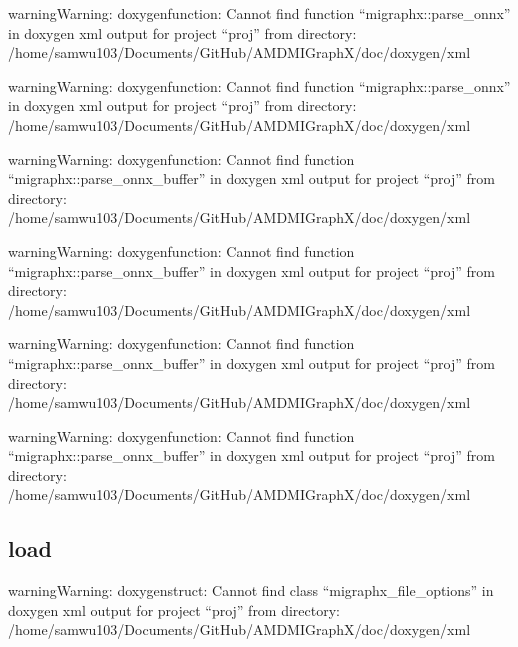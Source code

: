 \documentclass[letterpaper,10pt,english]{sphinxmanual}
\begin{document}
\begin{sphinxadmonition}{warning}{Warning:}
\sphinxAtStartPar
doxygenfunction: Cannot find function “migraphx::parse\_onnx” in doxygen xml output for project “proj” from directory: /home/samwu103/Documents/GitHub/AMDMIGraphX/doc/doxygen/xml
\end{sphinxadmonition}

\begin{sphinxadmonition}{warning}{Warning:}
\sphinxAtStartPar
doxygenfunction: Cannot find function “migraphx::parse\_onnx” in doxygen xml output for project “proj” from directory: /home/samwu103/Documents/GitHub/AMDMIGraphX/doc/doxygen/xml
\end{sphinxadmonition}

\begin{sphinxadmonition}{warning}{Warning:}
\sphinxAtStartPar
doxygenfunction: Cannot find function “migraphx::parse\_onnx\_buffer” in doxygen xml output for project “proj” from directory: /home/samwu103/Documents/GitHub/AMDMIGraphX/doc/doxygen/xml
\end{sphinxadmonition}

\begin{sphinxadmonition}{warning}{Warning:}
\sphinxAtStartPar
doxygenfunction: Cannot find function “migraphx::parse\_onnx\_buffer” in doxygen xml output for project “proj” from directory: /home/samwu103/Documents/GitHub/AMDMIGraphX/doc/doxygen/xml
\end{sphinxadmonition}

\begin{sphinxadmonition}{warning}{Warning:}
\sphinxAtStartPar
doxygenfunction: Cannot find function “migraphx::parse\_onnx\_buffer” in doxygen xml output for project “proj” from directory: /home/samwu103/Documents/GitHub/AMDMIGraphX/doc/doxygen/xml
\end{sphinxadmonition}

\begin{sphinxadmonition}{warning}{Warning:}
\sphinxAtStartPar
doxygenfunction: Cannot find function “migraphx::parse\_onnx\_buffer” in doxygen xml output for project “proj” from directory: /home/samwu103/Documents/GitHub/AMDMIGraphX/doc/doxygen/xml
\end{sphinxadmonition}


\subsection{load}
\label{\detokenize{reference/cpp:load}}
\begin{sphinxadmonition}{warning}{Warning:}
\sphinxAtStartPar
doxygenstruct: Cannot find class “migraphx\_file\_options” in doxygen xml output for project “proj” from directory: /home/samwu103/Documents/GitHub/AMDMIGraphX/doc/doxygen/xml
\end{sphinxadmonition}
\end{document}
